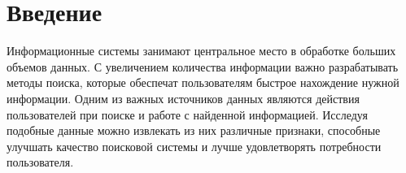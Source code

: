 \documentclass[diploma]{nanolab2015}
\begin{document}

%
%
%
%
%
\setcounter{page}{3}
\clearpage
\tableofcontents{}  %
\clearpage
\chapter{Введение}
Информационные системы занимают центральное место в обработке больших объемов данных. С увеличением количества информации важно разрабатывать методы поиска, которые обеспечат пользователям быстрое нахождение нужной информации. Одним из важных источников данных являются действия пользователей при поиске и работе с найденной информацией. Исследуя подобные данные можно извлекать из них различные признаки, способные улучшать качество поисковой системы и лучше удовлетворять потребности пользователя.
\end{document}
